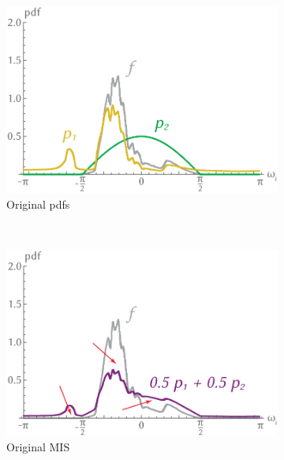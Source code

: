 \begin{figure}[h]
    \centering
    \begin{subfigure}[b]{.3\textwidth}
        \centering
        \includegraphics[width=\textwidth]{images/original_setup.png}
        \caption{Original pdfs}
        \label{fig:original_setup}
    \end{subfigure}
    ~
    \begin{subfigure}[b]{.3\textwidth}
        \centering
        \includegraphics[width=\textwidth]{images/mis_setup.png}
        \caption{Original MIS}
        \label{fig:original_mis}
    \end{subfigure}
    \\
    \begin{subfigure}[b]{.3\textwidth}
        \centering

\end{subfigure}
\end{figure}
